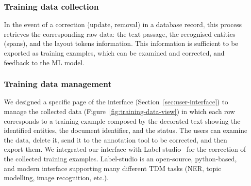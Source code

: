 \documentclass[]{interact}
\theoremstyle{plain} %
\theoremstyle{definition}
\theoremstyle{remark}
\begin{document}
\subsubsection{Training data collection}
In the event of a correction (update, removal) in a database record, this process retrieves the corresponding raw data: the text passage, the recognised entities (spans), and the layout tokens information. 
This information is sufficient to be exported as training examples, which can be examined and corrected, and feedback to the ML model. 

\subsubsection{Training data management}
We designed a specific page of the interface (Section~\ref{sec:user-interface}) to manage the collected data (Figure~\ref{fig:training-data-view}) in which each row corresponds to a training example composed by the decorated text showing the identified entities, the document identifier, and the status. 
The users can examine the data, delete it, send it to the annotation tool to be corrected, and then export them.
We integrated our interface with Label-studio~\cite{Label_Studio} for the correction of the collected training examples. 
Label-studio is an open-source, python-based, and modern interface supporting many different TDM tasks (NER, topic modelling, image recognition, etc.). 
\end{document}
